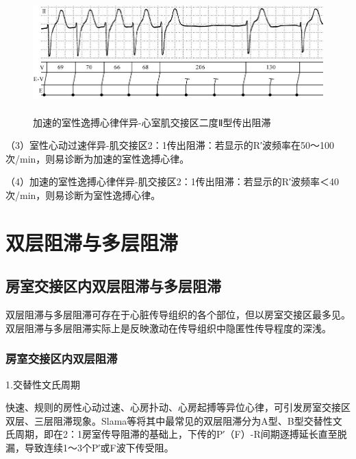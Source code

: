 \begin{figure}[!htbp]
 \centering
 \includegraphics[width=5.75in,height=1.83333in]{./images/Image00395.jpg}
 \captionsetup{justification=centering}
 \caption{加速的室性逸搏心律伴异-心室肌交接区二度Ⅱ型传出阻滞}
 \label{fig23-11}
  \end{figure} 

（3）室性心动过速伴异-肌交接区2：1传出阻滞：若显示的R′波频率在50～100次/min，则易诊断为加速的室性逸搏心律。

（4）加速的室性逸搏心律伴异-肌交接区2：1传出阻滞：若显示的R′波频率＜40次/min，则易诊断为室性逸搏心律。

\protect\hypertarget{text00031.html}{}{}

\protect\hypertarget{text00031.htmlux5cux23chapter31}{}{}

\chapter{双层阻滞与多层阻滞}

\protect\hypertarget{text00031.htmlux5cux23subid364}{}{}

\section{房室交接区内双层阻滞与多层阻滞}

双层阻滞与多层阻滞可存在于心脏传导组织的各个部位，但以房室交接区最多见。双层阻滞与多层阻滞实际上是反映激动在传导组织中隐匿性传导程度的深浅。

\protect\hypertarget{text00031.htmlux5cux23subid365}{}{}

\subsection{房室交接区内双层阻滞}

1.交替性文氏周期

快速、规则的房性心动过速、心房扑动、心房起搏等异位心律，可引发房室交接区双层、三层阻滞现象。Slama等将其中最常见的双层阻滞分为A型、B型交替性文氏周期，即在2：1房室传导阻滞的基础上，下传的P′（F）-R间期逐搏延长直至脱漏，导致连续1～3个P′或F波下传受阻。

